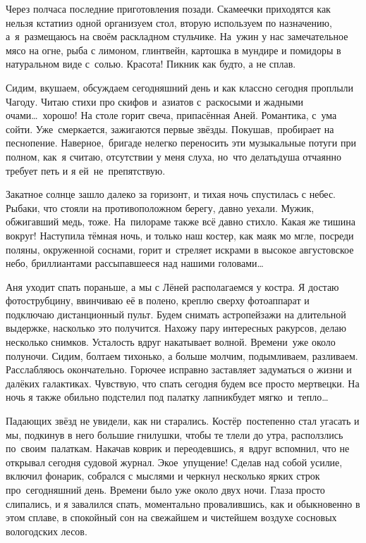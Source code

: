 Через полчаса последние приготовления позади. Скамеечки приходятся как нельзя кстати\mdash из одной организуем стол, вторую используем по назначению, а~я~размещаюсь на своём раскладном стульчике. На~ужин у нас замечательное мясо на огне, рыба с лимоном, глинтвейн, картошка в мундире и помидоры в натуральном виде с~солью. Красота! Пикник как будто, а не сплав. 

Сидим, вкушаем, обсуждаем сегодняшний день и как классно сегодня проплыли Чагоду. Читаю стихи про скифов и~азиатов с~раскосыми и жадными очами\ldots~хорошо! На столе горит свеча, припасённая Аней. Романтика, с~ума сойти. Уже~смеркается, зажигаются первые звёзды. Покушав,~пробирает на песнопение. Наверное,~бригаде нелегко переносить эти музыкальные потуги при полном, как~я считаю, отсутствии у меня слуха, но~что делать\mdash душа отчаянно требует петь и я ей~не~препятствую. 

Закатное солнце зашло далеко за горизонт, и тихая ночь спустилась с небес. Рыбаки, что стояли на противоположном берегу, давно уехали. Мужик, обжигавший медь, тоже. На~пилораме также всё давно стихло. Какая же тишина вокруг! Наступила тёмная ночь, и только наш костер, как маяк мо мгле, посреди поляны, окруженной соснами, горит и~стреляет искрами в высокое августовское небо, бриллиантами рассыпавшееся над нашими головами\ldots~

Аня уходит спать пораньше, а мы с Лёней располагаемся у костра. Я достаю фотострубцину, ввинчиваю её в полено, креплю сверху фотоаппарат и подключаю дистанционный пульт. Будем снимать астропейзажи на длительной выдержке, насколько это получится. Нахожу пару интересных ракурсов, делаю несколько снимков. Усталость вдруг накатывает волной. Времени~уже около полуночи. Сидим, болтаем тихонько, а больше молчим, подымливаем, разливаем. Расслабляюсь окончательно. Горючее исправно заставляет задуматься о жизни и далёких галактиках. Чувствую, что спать сегодня будем все просто мертвецки. На ночь я также обильно подстелил под палатку лапник\mdash будет мягко~и~тепло\ldots~
  
Падающих звёзд не увидели, как ни старались. Костёр~постепенно стал угасать и мы, подкинув в него большие гнилушки, чтобы те тлели до утра, расползлись по~своим~палаткам. Накачав коврик и переодевшись, я~вдруг вспомнил, что не открывал сегодня судовой журнал. Экое~упущение! Сделав над собой усилие, включил фонарик, собрался с мыслями и черкнул несколько ярких строк про~сегодняшний день. Времени было уже около двух ночи. Глаза просто слипались, и я завалился спать, моментально провалившись, как и обыкновенно в этом сплаве, в спокойный сон на свежайшем и чистейшем воздухе сосновых вологодских лесов.

\begin{center}
\end{center}